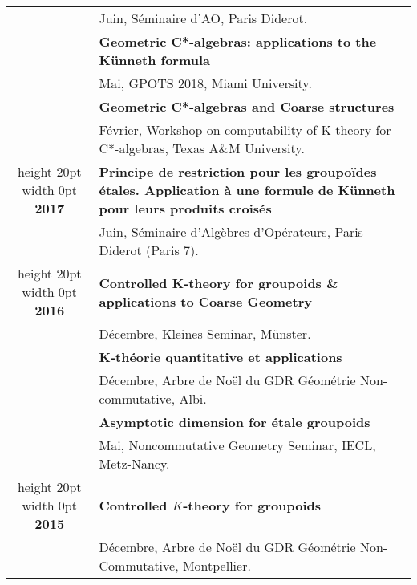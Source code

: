 \documentclass[a4paper,11pt]{article}
\newcommand\espace{\vrule height 20pt width 0pt}
\begin{document}
\begin{tabular}{cp{}}
				& Juin, S\'eminaire d'AO, Paris Diderot.\\
				& \textbf{Geometric C*-algebras: applications to the K\"unneth formula}\\
				& Mai, GPOTS 2018, Miami University.\\
				& \textbf{Geometric C*-algebras and Coarse structures}\\
				& F\'evrier, Workshop on computability of K-theory for C*-algebras, Texas A\&M University.\\
				\espace	
\textbf{2017} & \textbf{Principe de restriction pour les groupoïdes étales. Application à une formule de Künneth pour leurs produits croisés}\\
				& Juin, Séminaire d'Algèbres d'Opérateurs, Paris-Diderot (Paris 7).\\
				\espace	
\textbf{2016} & \textbf{Controlled K-theory for groupoids \& applications to Coarse Geometry}\\
				& D\'ecembre, Kleines Seminar, Münster.\\
				& \textbf{K-théorie quantitative et applications}\\
				& D\'ecembre, Arbre de Noël du GDR Géométrie Non-commutative, Albi.\\
				& \textbf{Asymptotic dimension for étale groupoids} \\
				& Mai, Noncommutative Geometry Seminar, IECL, Metz-Nancy.\\
				\espace	
\textbf{2015} & \textbf{Controlled $K$-theory for groupoids}\\
				& D\'ecembre, Arbre de Noël du GDR Géométrie Non-Commutative, Montpellier.\\
\end{tabular}
\end{document}
